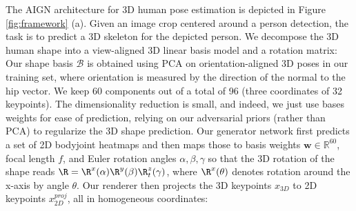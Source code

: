 \documentclass[10pt,twocolumn,letterpaper]{article}
\begin{document}
\begin{bibunit}[ieee]
The AIGN architecture for 3D human pose estimation is depicted in Figure \ref{fig:framework} (a). 
Given an image crop centered around a person detection, the task is to  
predict a 3D skeleton for the depicted person.   
We decompose the 3D human shape into a view-aligned 3D linear basis model %
and a rotation matrix: 
Our shape basis $\mathcal{B}$ is obtained using PCA on orientation-aligned 3D poses in our training set, where orientation is measured by the direction of the normal to the hip vector. 
We keep 60 components out of a total of 96 (three coordinates of 32 keypoints).
The dimensionality reduction is small, and indeed, we just use bases weights for ease of prediction, relying on our adversarial priors (rather than PCA) to regularize the 3D shape prediction. 
Our generator network first predicts a set of 2D bodyjoint heatmaps 
and then maps those to 
basis weights $\mathbf{w} \in \mathbb{R}^{60}$, focal length $f$, and  Euler rotation angles $\alpha,\beta,\gamma$ so that the 3D rotation of the shape reads $\R=\R^x(\alpha)\R^y(\beta)\R_t^z(\gamma)$, where $\R^x(\theta)$ denotes rotation around the x-axis by angle $\theta$.   
Our renderer then projects the 3D keypoints $x_{3D}$ to 2D keypoints $x^{proj}_{2D}$, all in homogeneous coordinates: 

\end{bibunit}
\end{document}
